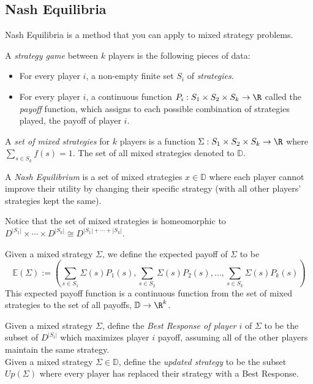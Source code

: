 \subsection{Nash Equilibria}
Nash Equilibria is a method that you can apply to mixed strategy problems.
\begin{definition}
	A \emph{strategy game} between $k$ players is the following pieces of data:
	\begin{itemize}
		\item For every player $i$,   a non-empty finite set $S_i$ of \emph{strategies}.
		\item For every player $i$,  a continuous function $P_i: S_1\times S_2\times  S_k\to \R$ called the \emph{payoff} function,  which assigns to each possible combination of strategies played,  the payoff of player $i$. 
	\end{itemize}
\end{definition}
\begin{definition}
	A \emph{set of mixed strategies} for $k$ players is a function $\Sigma: S_1\times S_2\times S_k\to \R$ where $\sum_{s\in S_k} f(s)=1$. The set of all mixed strategies denoted to $\mathbb D$. 
\end{definition}
\begin{definition}
	A \emph{Nash Equilibrium} is a set of mixed strategies $x\in \mathbb D$ where each player cannot improve their utility by changing their specific strategy (with all other players' strategies kept the same). 
\end{definition}

Notice that the set of mixed strategies is homeomorphic to $D^{|S_1|}\times \cdots \times D^{|S_k|}\cong D^{|S_1|+\cdots +|S_k|}$. 
\begin{definition}
	Given a mixed strategy $\Sigma$,  we define the expected payoff of $\Sigma$ to be 
	\[\mathbb{E}(\Sigma):= (\sum_{s\in S_1} \Sigma(s) P_1 (s),  \sum_{s\in S_2} \Sigma(s) P_2(s),  \ldots,  \sum_{s\in S_k} \Sigma(s) P_k(s))\]
	This expected payoff function is a continuous function from the set of mixed strategies to the set of all payoffs,   $\mathbb D \to \R^k$. 
\end{definition}
\begin{definition}
	Given a mixed strategy $\Sigma$,  define the \emph{Best Response of player $i$} of $\Sigma$ to be the subset of $D^{|S_i|}$ which maximizes player $i$ payoff,  assuming all of the other players maintain the same strategy.\\
	Given a mixed strategy $\Sigma\in \mathbb D$,  define the \emph{updated strategy} to be the subset $Up(\Sigma)$ where every player has replaced their strategy with a Best Response. 
\end{definition}

